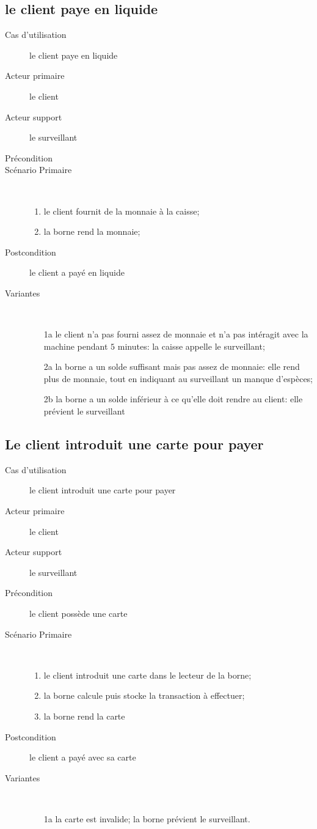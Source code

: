 \documentclass[a4paper]{article}
\begin{document}
\subsection{le client paye en liquide}
\begin{description}
	\item[Cas d'utilisation] le client paye en liquide
	\item[Acteur primaire] le client
	\item[Acteur support] le surveillant
	\item[Pr\'econdition]
	\item[Sc\'enario Primaire] \
	\begin{enumerate}
		\item le client fournit de la monnaie \`a la caisse;
		\item la borne rend la monnaie;
	\end{enumerate}
	\item[Postcondition] le client a pay\'e en liquide
	\item[Variantes] \
	\begin{enumerate}
		\item[1a] le client n'a pas fourni assez de monnaie et n'a
			pas int\'eragit avec la machine pendant $5$ minutes: la
			caisse appelle le surveillant;
		\item[2a] la borne a un solde suffisant mais pas assez de
			monnaie: elle rend plus de monnaie, tout en indiquant au
			surveillant un manque d'esp\`eces;
		\item[2b] la borne a un solde inf\'erieur \`a ce qu'elle doit
			rendre au client: elle pr\'evient le surveillant
	\end{enumerate}
\end{description}

\subsection{Le client introduit une carte pour payer}
\begin{description}
	\item[Cas d'utilisation] le client introduit une carte pour payer
	\item[Acteur primaire] le client
	\item[Acteur support] le surveillant
	\item[Pr\'econdition] le client poss\`ede une carte
	\item[Sc\'enario Primaire] \
	\begin{enumerate}
		\item le client introduit une carte dans le lecteur de la borne;
		\item la borne calcule puis stocke la transaction \`a effectuer;
		\item la borne rend la carte
	\end{enumerate}
	\item[Postcondition] le client a pay\'e avec sa carte
	\item[Variantes] \
	\begin{enumerate}
		\item[1a] la carte est invalide; la borne pr\'evient le surveillant.
	\end{enumerate}
\end{description}
\newpage
\end{document}
